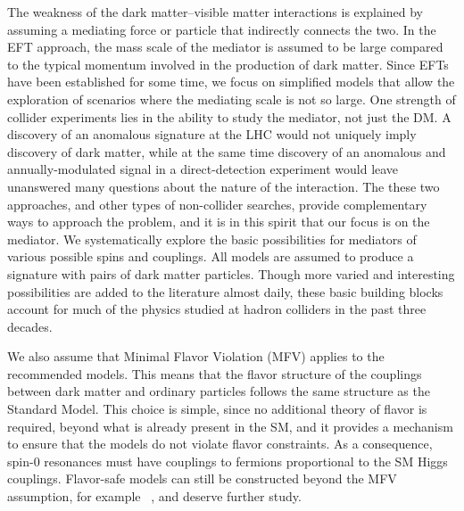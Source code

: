 The weakness of the dark matter--visible matter interactions is explained
by assuming a mediating force or particle that indirectly connects the
two.  In the EFT approach, the mass scale of the mediator is assumed
to be large compared to the typical momentum involved in the production
of dark matter.   Since EFTs have been established for some time,
we focus on 
simplified models that allow the exploration of scenarios where the
mediating scale is not so large.
One strength of collider experiments lies in the ability to
study the mediator, not just the DM. A discovery of an
anomalous \MET signature
at the LHC would not uniquely imply discovery of dark matter, while at
the same time discovery of an anomalous and annually-modulated signal
in a direct-detection experiment would leave unanswered many questions
about the nature of the interaction. The these two approaches, and
other types of non-collider searches, provide complementary ways to
approach the problem, and it is in this spirit that our focus is on
the mediator. We systematically explore the basic possibilities for
mediators of various possible spins and couplings.
All models are assumed to produce a signature with pairs of dark matter particles.
Though more varied and
interesting possibilities are added to the literature almost daily,
these basic building blocks account for much of the physics studied at
hadron colliders in the past three decades.


We also assume that Minimal Flavor Violation (MFV) \cite{Chivukula:1987py,Hall:1990ac,Buras:2000dm,D'Ambrosio:2002ex} applies to the
recommended models. This means that the flavor structure of the
couplings between dark matter and ordinary particles follows the same
structure as the Standard Model. This choice is simple, since no
additional theory of flavor is required, beyond what is already
present in the SM, and it provides a mechanism to ensure that the
models do not violate flavor constraints.  As a consequence, spin-0
resonances must have couplings to fermions proportional to the SM Higgs couplings. Flavor-safe models can still be constructed beyond the MFV
assumption, for example ~\cite{Agrawal:2014aoa}, and deserve further study.

